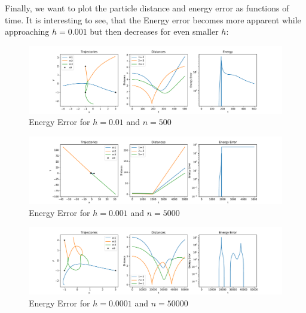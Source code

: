 \documentclass{article}
\begin{document}
Finally, we want to plot the particle distance and energy error as functions of
time. It is interesting to see, that the Energy error becomes more apparent while
approaching \( h=0.001 \) but then decreases for even smaller \( h \):
\begin{figure}[ht]
    \centering
    \includegraphics[width=\textwidth]{fig2b_distances_large.pdf} 
    \caption{Energy Error for $h = 0.01$ and $n = 500$}  
\end{figure}
\begin{figure}[ht]
    \centering
    \includegraphics[width=\textwidth]{fig2b_distances_medium.pdf} 
    \caption{Energy Error for $h = 0.001$ and $n = 5000$}  
\end{figure}
\begin{figure}[ht]
    \centering
    \includegraphics[width=\textwidth]{fig2b_distances_small.pdf} 
    \caption{Energy Error for $h = 0.0001$ and $n = 50000$}  
\end{figure}
\end{document}
